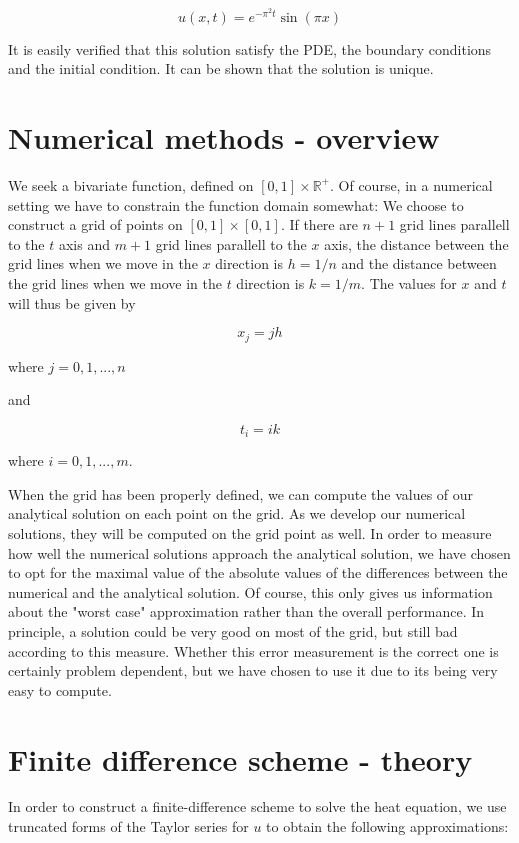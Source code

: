 \documentclass{article}
\begin{document}
\begin{equation}
    u(x, t) = e^{-\pi^2 t} \sin(\pi x)
\end{equation}

It is easily verified that this solution satisfy the PDE, the boundary conditions and the initial condition. It can be shown that the solution is unique.

\section{Numerical methods - overview}
We seek a bivariate function, defined on $[0, 1] \times \mathbb{R}^+$. Of course, in a numerical setting we have to constrain the function domain somewhat: We choose to construct a grid of points on $[0, 1] \times [0, 1]$. If there are $n + 1$ grid lines parallell to the $t$ axis and $m + 1$ grid lines parallell to the $x$ axis, the distance between the grid lines when we move in the $x$ direction is $h = 1/n$ and the distance between the grid lines when we move in the $t$ direction is $k = 1/m$. The values for $x$ and $t$ will thus be given by

\begin{equation}
    x_j = jh
\end{equation}

where $j = 0, 1, ..., n$

and

\begin{equation}
    t_i = ik
\end{equation}

where $i = 0, 1, ..., m$.

When the grid has been properly defined, we can compute the values of our analytical solution on each point on the grid. As we develop our numerical solutions, they will be computed on the grid point as well. In order to measure how well the numerical solutions approach the analytical solution, we have chosen to opt for the maximal value of the absolute values of the differences between the numerical and the analytical solution. Of course, this only gives us information about the "worst case" approximation rather than the overall performance. In principle, a solution could be very good on most of the grid, but still bad according to this measure. Whether this error measurement is the correct one is certainly problem dependent, but we have chosen to use it due to its being very easy to compute.

\section{Finite difference scheme - theory}
In order to construct a finite-difference scheme to solve the heat equation, we use truncated forms of the Taylor series for $u$ to obtain the following approximations:
\end{document}
